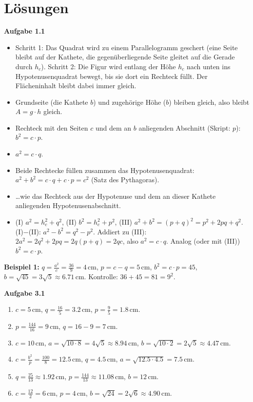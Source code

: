 \documentclass[11pt,oneside]{article}
\begin{document}
\newpage
\section*{Lösungen}
\textbf{Aufgabe 1.1}
\begin{itemize}[itemsep=0pt]
	\item[a)] Schritt 1: Das Quadrat wird zu einem Parallelogramm geschert (eine Seite bleibt auf der Kathete, die gegenüberliegende Seite gleitet auf die Gerade durch $h_c$). Schritt 2: Die Figur wird entlang der Höhe $h_c$ nach unten ins Hypotenusenquadrat bewegt, bis sie dort ein Rechteck füllt. Der Flächeninhalt bleibt dabei immer gleich.
	\item[b)] Grundseite (die Kathete $b$) und zugehörige Höhe ($b$) bleiben gleich, also bleibt $A=g\cdot h$ gleich.
	\item[c)] Rechteck mit den Seiten $c$ und dem an $b$ anliegenden Abschnitt (Skript: $p$): $b^2=c\cdot p$.
	\item[d)] $a^2=c\cdot q$.
	\item[e)] Beide Rechtecke füllen zusammen das Hypotenusenquadrat: $a^2+b^2=c\cdot q+c\cdot p=c^2$ (Satz des Pythagoras).
	\item[f)] \ldots wie das Rechteck aus der Hypotenuse und dem an dieser Kathete anliegenden Hypotenusenabschnitt.
	\item[g)--h)] (I) $a^2=h_c^2+q^2$, (II) $b^2=h_c^2+p^2$, (III) $a^2+b^2=(p+q)^2=p^2+2pq+q^2$.\\
	(I)$-$(II): $a^2-b^2=q^2-p^2$. Addiert zu (III): $2a^2=2q^2+2pq=2q(p+q)=2qc$, also $a^2=c\cdot q$. Analog (oder mit (III)) $b^2=c\cdot p$.
\end{itemize}

\textbf{Beispiel 1:} $q=\frac{a^2}{c}=\frac{36}{9}=4$\,cm, $p=c-q=5$\,cm, $b^2=c\cdot p=45$, $b=\sqrt{45}=3\sqrt5\approx 6.71$\,cm. Kontrolle: $36+45=81=9^2$.

\textbf{Aufgabe 3.1}
\begin{enumerate}[label=\alph*), itemsep=0pt]
	\item $c=5$\,cm, $q=\frac{16}{5}=3.2$\,cm, $p=\frac{9}{5}=1.8$\,cm.
	\item $p=\frac{144}{16}=9$\,cm, $q=16-9=7$\,cm.
	\item $c=10$\,cm, $a=\sqrt{10\cdot 8}=4\sqrt5\approx 8.94$\,cm, $b=\sqrt{10\cdot 2}=2\sqrt5\approx 4.47$\,cm.
	\item $c=\frac{b^2}{p}=\frac{100}{8}=12.5$\,cm, $q=4.5$\,cm, $a=\sqrt{12.5\cdot 4.5}=7.5$\,cm.
	\item $q=\frac{25}{13}\approx 1.92$\,cm, $p=\frac{144}{13}\approx 11.08$\,cm, $b=12$\,cm.
	\item $c=\frac{12}{2}=6$\,cm, $p=4$\,cm, $b=\sqrt{24}=2\sqrt6\approx 4.90$\,cm.
\end{enumerate}
\end{document}

